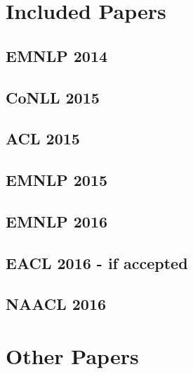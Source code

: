 \documentclass[12pt,twoside,final,hidelinks]{ltthesis}
\theoremstyle{definition}
\begin{document}


\chapter{Included Papers}
\section{EMNLP 2014}

\section{CoNLL 2015}
\section{ACL 2015}
\section{EMNLP 2015}
\section{EMNLP 2016}
\section{EACL 2016 - if accepted}
\section{NAACL 2016}

\appendix
\chapter{Other Papers}
%

\end{document}
